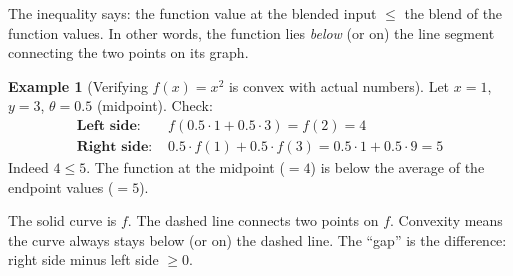 \documentclass[10pt]{article}
\theoremstyle{definition}
\newtheorem{example}{Example}
\theoremstyle{plain}
\begin{document}
The inequality says: the function value at the blended input $\le$ the blend of the function values. In other words, the function lies \emph{below} (or on) the line segment connecting the two points on its graph.

\begin{example}[Verifying $f(x) = x^2$ is convex with actual numbers]
Let $x = 1$, $y = 3$, $\theta = 0.5$ (midpoint). Check:
\begin{align*}
    \textbf{Left side: } &f(0.5 \cdot 1 + 0.5 \cdot 3) = f(2) = 4 \\
    \textbf{Right side: } &0.5 \cdot f(1) + 0.5 \cdot f(3) = 0.5 \cdot 1 + 0.5 \cdot 9 = 5
\end{align*}
Indeed $4 \le 5$. \checkmark \; The function at the midpoint ($= 4$) is below the average of the endpoint values ($= 5$).
\end{example}

\begin{tcolorbox}[colframe=black!50, title={\small Visual picture}]
\begin{center}
\end{center}

The solid curve is $f$. The dashed line connects two points on $f$. Convexity means the curve always stays below (or on) the dashed line. The ``gap'' is the difference: right side minus left side $\ge 0$.
\end{tcolorbox}
\end{document}
